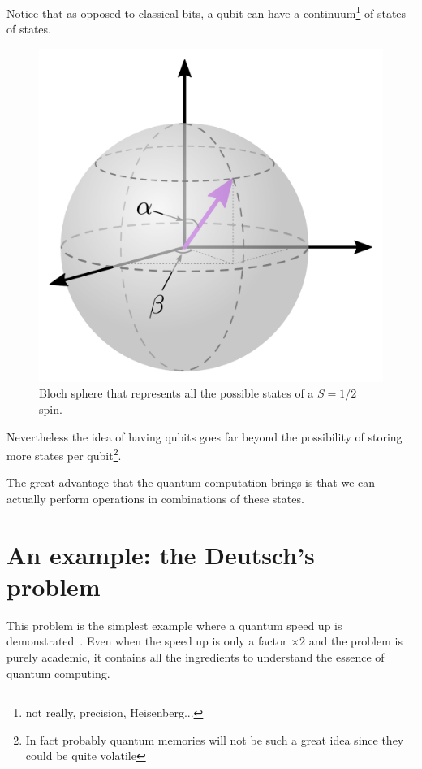 Notice that as opposed to classical bits, a qubit can have a continuum\footnote{not really, precision, Heisenberg...} of states of states.

\begin{figure}[!h]
\centering
\includegraphics{chapter02/figures/bloch_sphere.pdf}
\vspace{-5pt}
\caption{Bloch sphere that represents all the possible states of a $S=1/2$ spin.}
\label{Bsph}
\end{figure}
\FloatBarrier

Nevertheless the idea of having qubits goes far beyond the possibility of storing more states per qubit\footnote{In fact probably quantum memories will not be such a great idea since they could be quite volatile}.

The great advantage that the quantum computation brings is that we can actually perform operations in combinations of these states. 








\section{An example: the Deutsch's problem}
This problem is the simplest example where a quantum speed up is demonstrated~\cite{Deutsch1992}. Even when the speed up is only a factor $\times2$ and the problem is purely academic, it contains all the ingredients to understand the essence of quantum computing.


